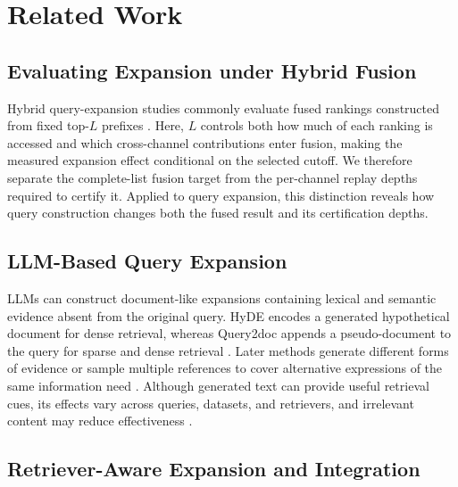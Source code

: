 \section{Related Work}

\label{sec:related-work}

\subsection{Evaluating Expansion under Hybrid Fusion}

\label{evaluating-expansion-under-hybrid-fusion}

Hybrid query-expansion studies commonly evaluate fused rankings constructed from fixed top-\(L\) prefixes \citep{zhang-etal-2024-exploring-best, liu-zhang-2025-exp4fuse}. Here, \(L\) controls both how much of each ranking is accessed and which cross-channel contributions enter fusion, making the measured expansion effect conditional on the selected cutoff. We therefore separate the complete-list fusion target from the per-channel replay depths required to certify it. Applied to query expansion, this distinction reveals how query construction changes both the fused result and its certification depths.

\subsection{LLM-Based Query Expansion}

\label{llm-based-query-expansion}

LLMs can construct document-like expansions containing lexical and semantic evidence absent from the original query. HyDE encodes a generated hypothetical document for dense retrieval, whereas Query2doc appends a pseudo-document to the query for sparse and dense retrieval \citep{gao-etal-2023-precise, wang-etal-2023-query2doc}. Later methods generate different forms of evidence or sample multiple references to cover alternative expressions of the same information need \citep{jagerman-etal-2023-query-expansion, zhang-etal-2024-exploring-best}. Although generated text can provide useful retrieval cues, its effects vary across queries, datasets, and retrievers, and irrelevant content may reduce effectiveness \citep{weller-etal-2024-generative}.

\subsection{Retriever-Aware Expansion and Integration}

